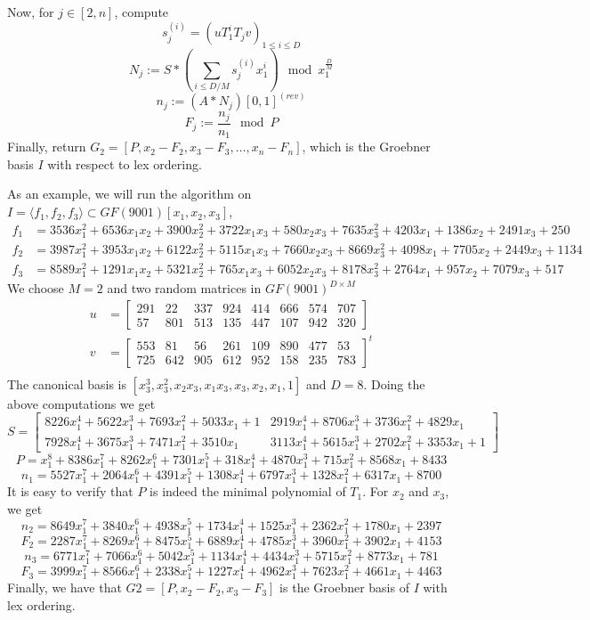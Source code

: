 \documentclass[12pt]{article}
\begin{document}
Now, for $j \in [2,n]$, compute 
$$s_j^{(i)} = (uT_1^i T_j v)_{1\le i \le D}$$
$$N_j := S*(\sum_{i\le D/M} s_j^{(i)} x_1^i) \mod x_1^{\frac{D}{M}}$$
$$n_j := (A*N_j)[0,1]^{(rev)}$$
$$F_j := \frac{n_j}{n_1} \mod P$$
Finally, return $G_2 = [P, x_2 - F_2, x_3 - F_3, \dots, x_n - F_n]$, which is the Groebner basis
$I$ with respect to lex ordering.

As an example, we will run the algorithm on $I = \langle f_1, f_2, f_3 \rangle \subset GF(9001)[x_1,x_2,x_3]$,
\begin{align*}
f_1 &= 3536x_1^2 +6536x_1x_2 + 3900x_2^2 + 3722x_1x_3 + 580x_2x_3 + 7635x_3^2 + 4203x_1 + 1386x_2 + 2491x_3 + 250\\
f_2 &= 3987x_1^2 + 3953x_1x_2 +6122x_2^2 +5115x_1x_3 +7660x_2x_3 +8669x_3^2 + 4098x_1 +7705x_2 + 2449x_3 + 1134\\
f_3 &= 8589x_1^2 + 1291x_1x_2 +5321x_2^2 + 765x_1x_3 +6052x_2x_3 +8178x_3^2 + 2764x_1 + 957x_2 +7079x_3 + 517
\end{align*}
We choose $M = 2$ and two random matrices in $GF(9001)^{D\times M}$
\begin{align*}
u &= \begin{bmatrix}
291&  22& 337& 924& 414& 666& 574& 707\\
57& 801& 513& 135& 447& 107& 942& 320
\end{bmatrix}\\
v &= \begin{bmatrix}
553&  81&  56& 261& 109& 890& 477&  53\\
725& 642& 905& 612& 952& 158& 235& 783
\end{bmatrix} ^ {t}\\
\end{align*}
The canonical basis is $[x_3^3, x_3^2, x_2x_3, x_1x_3, x_3, x_2, x_1, 1]$ and $D = 8$. Doing the above computations we get
$$S= \begin{bmatrix}
8226x_1^4 + 5622x_1^3 + 7693x_1^2 + 5033x_1 + 1&     2919x_1^4 + 8706x_1^3 + 3736x_1^2 + 4829x_1\\
7928x_1^4 + 3675x_1^3 + 7471x_1^2 + 3510x_1& 3113x_1^4 + 5615x_1^3 + 2702x_1^2 + 3353x_1 + 1
\end{bmatrix}$$
$$P =x_1^8 + 8386x_1^7 + 8262x_1^6 + 7301x_1^5 + 318x_1^4 + 4870x_1^3 + 715x_1^2 + 8568x_1 + 8433$$
$$n_1 = 5527x_1^7 + 2064x_1^6 + 4391x_1^5 + 1308x_1^4 + 6797x_1^3 + 1328x_1^2 + 6317x_1 + 8700$$
It is easy to verify that $P$ is indeed the minimal polynomial of $T_1$.
For $x_2$ and $x_3$, we get
$$n_2 = 8649x_1^7 + 3840x_1^6 + 4938x_1^5 + 1734x_1^4 + 1525x_1^3 + 2362x_1^2 + 1780x_1 + 2397$$
$$F_2 = 2287x_1^7 + 8269x_1^6 + 8475x_1^5 + 6889x_1^4 + 4785x_1^3 + 3960x_1^2 + 3902x_1 + 4153$$
$$n_3 = 6771x_1^7 + 7066x_1^6 + 5042x_1^5 + 1134x_1^4 + 4434x_1^3 + 5715x_1^2 + 8773x_1 + 781$$
$$F_3 = 3999x_1^7 + 8566x_1^6 + 2338x_1^5 + 1227x_1^4 + 4962x_1^3 + 7623x_1^2 + 4661x_1 + 4463$$
Finally, we have that $G2 = [P, x_2-F_2, x_3-F_3]$ is the Groebner basis of $I$ with lex ordering.
\end{document}
